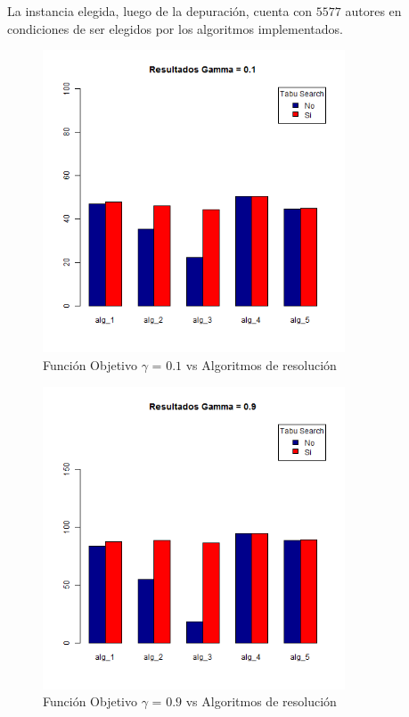 La instancia elegida, luego de la depuración, cuenta con $5577$ autores en condiciones de ser elegidos por los algoritmos implementados.\\

\begin{figure}[H]
  \centering
    \includegraphics[width=0.8\textwidth]{resultados/authors/Graficos_agrupados/gamma01-autores.png}
  \caption{Función Objetivo $\gamma$ = $0.1$ vs Algoritmos de resolución}
  \label{res:img-autores-agr-gamma01}
\end{figure}

\begin{figure}[H]
  \centering
    \includegraphics[width=0.8\textwidth]{resultados/authors/Graficos_agrupados/gamma09-autores.png}
  \caption{Función Objetivo $\gamma$ = $0.9$ vs Algoritmos de resolución}
  \label{res:img-autores-agr-gamma09}
\end{figure}

